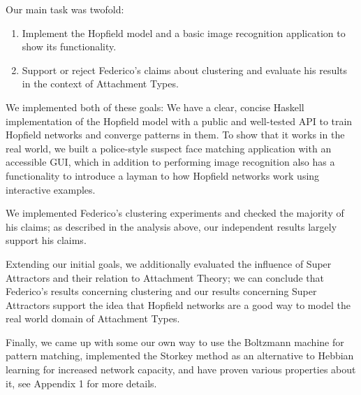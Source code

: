 Our main task was twofold:

\begin{enumerate}
\item Implement the Hopfield model and a basic image recognition application to show its functionality.
\item Support or reject Federico's claims about clustering and evaluate his results in the context of Attachment Types.
\end{enumerate}

We implemented both of these goals: We have a clear, concise Haskell implementation of the Hopfield model with a public and well-tested API to train Hopfield networks and converge patterns in them. To show that it works in the real world, we built a police-style suspect face matching application with an accessible GUI, which in addition to performing image recognition also has a functionality to introduce a layman to how Hopfield networks work using interactive examples.

We implemented Federico's clustering experiments and checked the majority of his claims; as described in the analysis above, our independent results largely support his claims.

Extending our initial goals, we additionally evaluated the influence of Super Attractors and their relation to Attachment Theory; we can conclude that Federico's results concerning clustering and our results concerning Super Attractors support the idea that Hopfield networks are a good way to model the real world domain of Attachment Types.


Finally, we came up with some our own way to use the Boltzmann machine for pattern matching, implemented the Storkey method as an alternative to Hebbian learning for increased network capacity, and have proven various properties about it, see Appendix 1 for more details.
